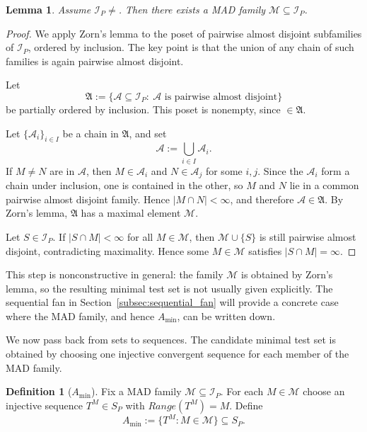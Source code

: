 \documentclass[11pt]{amsart}
\theoremstyle{plain}
\newtheorem{lemma}[theorem]{Lemma}
\theoremstyle{definition}
\newtheorem{definition}[theorem]{Definition}
\theoremstyle{remark}
\newcommand{\Sp}{\mathcal{S}_P}
\DeclareMathOperator{\Range}{Range}
\def\Sp{S_P}%
\def\Range{Range}%
\def\emptyset{}%
\begin{document}
\begin{lemma}\label{lem:MAD_exists}
Assume $\mathcal I_P\neq\emptyset$.
Then there exists a MAD family $\mathcal M\subseteq\mathcal I_P$.
\end{lemma}

\begin{proof}
We apply Zorn's lemma to the poset of pairwise almost disjoint subfamilies of $\mathcal I_P$, ordered by inclusion.
The key point is that the union of any chain of such families is again pairwise almost disjoint.

Let
\[
\mathfrak A:=\{\mathcal A\subseteq\mathcal I_P:\ \mathcal A\text{ is pairwise almost disjoint}\}
\]
be partially ordered by inclusion.
This poset is nonempty, since $\emptyset\in\mathfrak A$.

Let $\{\mathcal A_i\}_{i\in I}$ be a chain in $\mathfrak A$, and set
\[
\mathcal A:=\bigcup_{i\in I}\mathcal A_i.
\]
If $M\neq N$ are in $\mathcal A$, then $M\in\mathcal A_i$ and $N\in\mathcal A_j$ for some $i,j$.
Since the $\mathcal A_i$ form a chain under inclusion, one is contained in the other, so $M$ and $N$ lie in a common pairwise almost disjoint family.
Hence $|M\cap N|<\infty$, and therefore $\mathcal A\in\mathfrak A$.
By Zorn's lemma, $\mathfrak A$ has a maximal element $\mathcal M$.

Let $S\in\mathcal I_P$.
If $|S\cap M|<\infty$ for all $M\in\mathcal M$, then $\mathcal M\cup\{S\}$ is still pairwise almost disjoint, contradicting maximality.
Hence some $M\in\mathcal M$ satisfies $|S\cap M|=\infty$.
\end{proof}

This step is nonconstructive in general: the family $\mathcal M$ is obtained by Zorn's lemma, so the resulting minimal test set is not usually given explicitly.
The sequential fan in Section~\ref{subsec:sequential_fan} will provide a concrete case where the MAD family, and hence $A_{\min}$, can be written down.

We now pass back from sets to sequences.
The candidate minimal test set is obtained by choosing one injective convergent sequence for each member of the MAD family.

\begin{definition}[$A_{\min}$]\label{def:Amin_T1}
Fix a MAD family $\mathcal M\subseteq\mathcal I_P$.
For each $M\in\mathcal M$ choose an injective sequence $T^M\in\Sp$ with $\Range(T^M)=M$.
Define
\[
A_{\min}:=\{T^M:M\in\mathcal M\}\subseteq\Sp.
\]
\end{definition}
\end{document}
